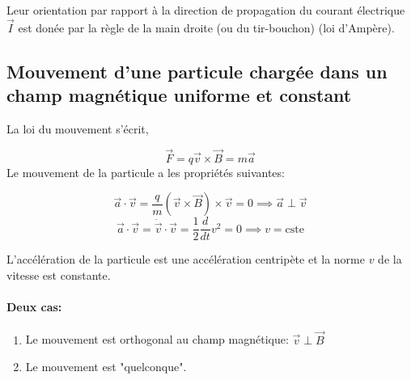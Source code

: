 \documentclass[
    11pt,
    a4paper,
    oneside,
    headinlcude, footinclude,
    twoside,
]{report}
\renewcommand{\vec}[1]{\overrightarrow{#1}}
\begin{document}
Leur orientation par rapport à la direction de propagation du courant
électrique $\vec I$ est donée par la règle de la main droite (ou du
tir-bouchon) (loi d'Ampère).

\subsection{Mouvement d'une particule chargée dans un champ magnétique uniforme
et constant}
\label{sub:mouvement_d_une_particule_chargee_dans_un_champ_magnetique_uniforme_et_constant}

La loi du mouvement s'écrit,

\begin{equation}
    \label{eq:9.2} 
    \vec F = q \vec v \times \vec B = m \vec a 
\end{equation}
Le mouvement de la particule a les propriétés suivantes:

$$ \vec a \cdot \vec v = \frac{q}{m} \left(\vec v \times \vec B\right) \times
\vec v = 0\implies \vec a \perp \vec v$$
$$ \vec a \cdot \vec v = \dot{\vec v} \cdot \vec v = \frac{1}{2} \frac{d}{dt}v^2 =0 \implies v
= \text{cste}$$

L'accélération de la particule est une accélération centripète et la norme $v$
de la vitesse est constante.

\paragraph{Deux cas:}
\begin{enumerate}
    \item Le mouvement est orthogonal au champ magnétique: $\vec v \perp \vec B $
    \item Le mouvement est "quelconque".
\end{enumerate}
\end{document}

